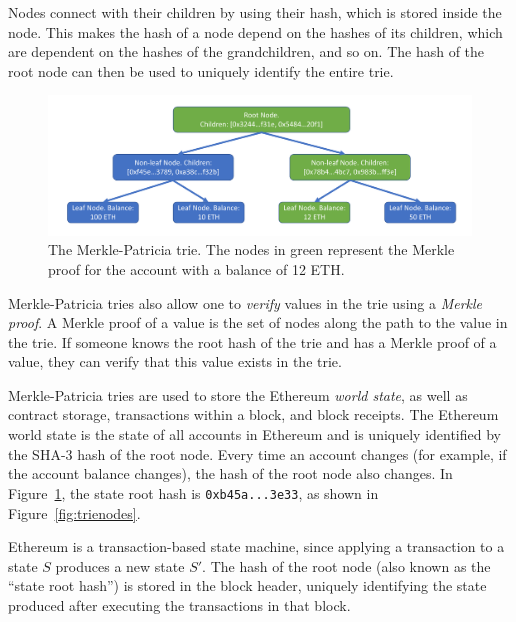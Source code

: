 \documentclass[12pt]{article}
\begin{document}
Nodes connect with their children by using their hash, which is stored inside the node. This makes the hash of a node depend on the hashes of its children, which are dependent on the hashes of the grandchildren, and so on. The hash of the root node can then be used to uniquely identify the entire trie.

\begin{figure}[H]
  \centering
  \includegraphics[width=\textwidth]{../figures/background/trie/tree_with_merkle_proof.pdf}
  \caption{The Merkle-Patricia trie. The nodes in green represent the Merkle proof for the account with a balance of 12 ETH.} \label{fig:trie}
\end{figure}

Merkle-Patricia tries also allow one to \emph{verify} values in the trie using a \emph{Merkle proof}. A Merkle proof of a value is the set of nodes along the path to the value in the trie. If someone knows the root hash of the trie and has a Merkle proof of a value, they can verify that this value exists in the trie.


Merkle-Patricia tries are used to store the Ethereum \emph{world state}, as well as contract storage, transactions within a block, and block receipts. The Ethereum world state is the state of all accounts in Ethereum and is uniquely identified by the SHA-3 hash of the root node. Every time an account changes (for example, if the account balance changes), the hash of the root node also changes. In Figure~\ref{fig:trie}, the state root hash is \texttt{0xb45a...3e33}, as shown in Figure~\ref{fig:trienodes}.

Ethereum is a transaction-based state machine, since applying a transaction to a state $S$ produces a new state $S'$. The hash of the root node (also known as the ``state root hash'') is stored in the block header, uniquely identifying the state produced after executing the transactions in that block.

\end{document}
